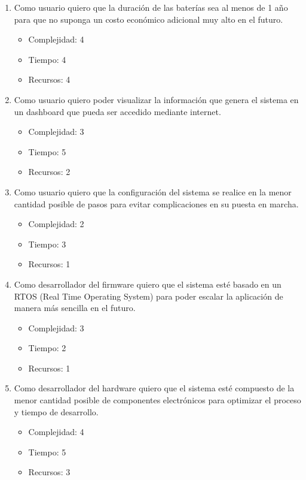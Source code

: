 \documentclass[
11pt, %
]{plan}
\begin{document}
\begin{enumerate}
	\item Como usuario quiero que la duración de las baterías sea al menos de 1 año para que no suponga un costo económico adicional muy alto en el futuro.
	\begin{itemize}
		\item Complejidad: 4
		\item Tiempo: 4
		\item Recursos: 4
	\end{itemize}
		\item Como usuario quiero poder visualizar la información que genera el sistema en un dashboard que pueda ser accedido mediante internet.
	\begin{itemize}
		\item Complejidad: 3
		\item Tiempo: 5
		\item Recursos: 2
	\end{itemize}
	\item Como usuario quiero que la configuración del sistema se realice en la menor cantidad posible de pasos para evitar complicaciones en su puesta en marcha.
	\begin{itemize}
		\item Complejidad: 2
		\item Tiempo: 3
		\item Recursos: 1
	\end{itemize}
	\item Como desarrollador del firmware quiero que el sistema esté basado en un RTOS (Real Time Operating System) para poder escalar la aplicación de manera más sencilla en el futuro.
	\begin{itemize}
		\item Complejidad: 3
		\item Tiempo: 2
		\item Recursos: 1
	\end{itemize}
	\item Como desarrollador del hardware quiero que el sistema esté compuesto de la menor cantidad posible de componentes electrónicos para optimizar el proceso y tiempo de desarrollo.
	\begin{itemize}
		\item Complejidad: 4
		\item Tiempo: 5
		\item Recursos: 3
	\end{itemize}	
\end{enumerate}
\end{document}

